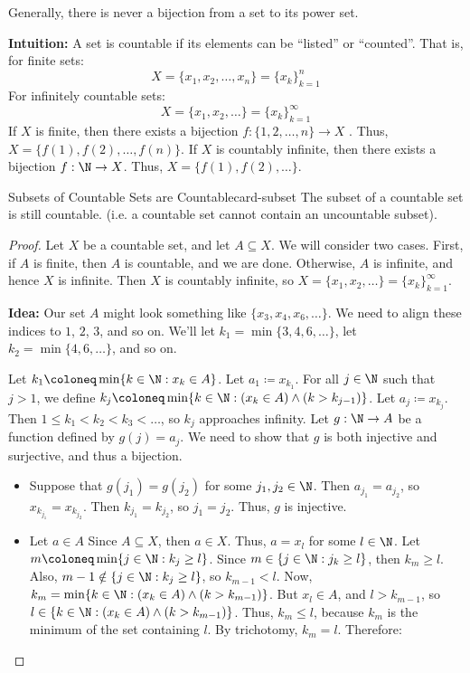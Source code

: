 Generally, there is never a bijection from a set to its power set.

\begin{notebox}
    \textbf{Intuition:} A set is countable if its elements can be ``listed'' or ``counted''. That is, for finite sets:
    \[ X = \{x_1, x_2, \ldots, x_n\} = \{x_k\}_{k=1}^{n}\]
    For infinitely countable sets:
    \[ X = \{x_1, x_2, \ldots \} = \{x_k\}_{k=1}^\infty \]
    If $X$ is finite, then there exists a bijection $f : \{1,2,\ldots,n\} \to X$ . Thus, $X = \{f(1), f(2), \ldots, f(n) \}$. If $X$ is countably infinite, then there exists a bijection $f : \N \to X$. Thus, $X = \{f(1), f(2), \ldots\}$.
\end{notebox}

\begin{thmbox}{Subsets of Countable Sets are Countable}{card-subset}
    The subset of a countable set is still countable. (i.e. a countable set cannot contain an uncountable subset).
    \tcblower
    \begin{proof}
        Let $X$ be a countable set, and let $A \subseteq X$. We will consider two cases. First, if $A$ is finite, then $A$ is countable, and we are done. Otherwise, $A$ is infinite, and hence $X$ is infinite. Then $X$ is countably infinite, so $X = \{x_1, x_2, \ldots\} = \{x_k\}_{k=1}^\infty$.
        \begin{notebox}
            \textbf{Idea:} Our set $A$ might look something like $\{x_3, x_4, x_6, \ldots\}$. We need to align these indices to $1$, $2$, $3$, and so on. We'll let $k_1 = \min\{3,4,6,\ldots\}$, let $k_2 = \min\{4,6,\ldots\}$, and so on.
        \end{notebox}
        Let $k_1 \coloneq \min\{k \in \N : x_k \in A\}$. Let $a_1 \coloneq x_{k_1}$. For all $j \in \N$ such that $j > 1$, we define $k_j \coloneq \min\{k \in \N : (x_k \in A) \land (k > k_{j-1}) \}$. Let $a_j \coloneq x_{k_j}$. Then $1 \leq k_1 < k_2 < k_3 < \ldots$, so $k_j$ approaches infinity. Let $g : \N \to A$ be a function defined by $g(j) = a_j$. We need to show that $g$ is both injective and surjective, and thus a bijection.
        \begin{itemize}
            \item Suppose that $g(j_1) = g(j_2)$ for some $j_1, j_2 \in \N$. Then $a_{j_1} = a_{j_2}$, so $x_{k_{j_1}} = x_{k_{j_2}}$. Then $k_{j_1} = k_{j_2}$, so $j_1 = j_2$. Thus, $g$ is injective.
            \item Let $a \in A$ Since $A \subseteq X$, then $a \in X$. Thus, $a = x_l$ for some $l \in \N$. Let $m \coloneq \min\{ j \in \N : k_j \geq l \}$. Since $m \in \{ j \in \N : j_k \geq l \}$, then $k_m \geq l$. Also, $m-1 \notin \{j \in \N : k_j \geq l \}$, so $k_{m-1} < l$. Now, $k_m = \min\{k \in \N : (x_k \in A) \land (k > k_{m-1})\}$. But $x_l \in A$, and $l > k_{m-1}$, so $l \in \{k \in \N : (x_k \in A) \land (k > k_{m-1}) \}$. Thus, $k_m \leq l$, because $k_m$ is the minimum of the set containing $l$. By trichotomy, $k_m = l$. Therefore:

\end{itemize}
\end{proof}
\end{thmbox}
